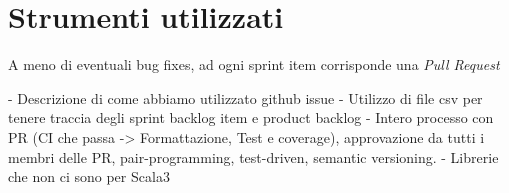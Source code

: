 \section{Strumenti utilizzati}\label{sec:strumenti-utilizzati}
A meno di eventuali bug fixes, ad ogni sprint item corrisponde una \textit{Pull Request}

- Descrizione di come abbiamo utilizzato github issue
- Utilizzo di file csv per tenere traccia degli sprint backlog item e product backlog
- Intero processo con PR (CI che passa -> Formattazione, Test e coverage), approvazione da tutti i membri delle PR, pair-programming, test-driven, semantic versioning.
- Librerie che non ci sono per Scala3